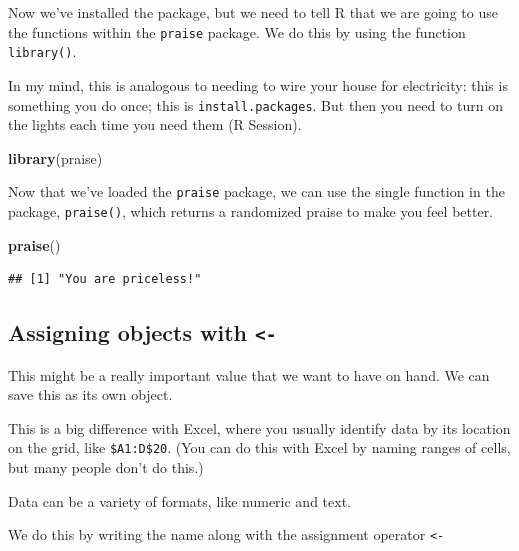 \documentclass[]{book}
\newenvironment{Shaded}{\begin{snugshade}}{\end{snugshade}}
\newcommand{\KeywordTok}[1]{\textcolor[rgb]{0.13,0.29,0.53}{\textbf{#1}}}
\newcommand{\NormalTok}[1]{#1}
\newcommand{\OperatorTok}[1]{\textcolor[rgb]{0.81,0.36,0.00}{\textbf{#1}}}
\newcommand{\StringTok}[1]{\textcolor[rgb]{0.31,0.60,0.02}{#1}}
\begin{document}
Now we've installed the package, but we need to tell R that we are going to use the functions within the \texttt{praise} package. We do this by using the function \texttt{library()}.

In my mind, this is analogous to needing to wire your house for electricity: this is something you do once; this is \texttt{install.packages}. But then you need to turn on the lights each time you need them (R Session).

\begin{Shaded}
\begin{Highlighting}[]
\KeywordTok{library}\NormalTok{(praise)}
\end{Highlighting}
\end{Shaded}

Now that we've loaded the \texttt{praise} package, we can use the single function in the package, \texttt{praise()}, which returns a randomized praise to make you feel better.

\begin{Shaded}
\begin{Highlighting}[]
\KeywordTok{praise}\NormalTok{()}
\end{Highlighting}
\end{Shaded}

\begin{verbatim}
## [1] "You are priceless!"
\end{verbatim}

\hypertarget{assigning-objects-with--}{%
\subsection{\texorpdfstring{Assigning objects with \texttt{\textless{}-}}{Assigning objects with \textless{}-}}\label{assigning-objects-with--}}

This might be a really important value that we want to have on hand. We can save this as its own object.

This is a big difference with Excel, where you usually identify data by its location on the grid, like \texttt{\$A1:D\$20}. (You can do this with Excel by naming ranges of cells, but many people don't do this.)

Data can be a variety of formats, like numeric and text.

We do this by writing the name along with the assignment operator \texttt{\textless{}-}

\begin{Shaded}
\end{Shaded}
\end{document}
